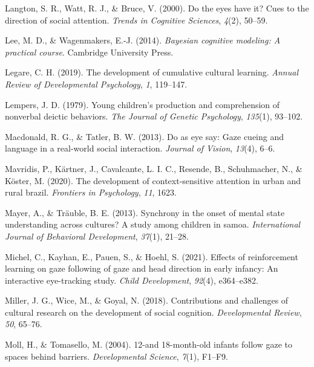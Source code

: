 \documentclass[
  man,floatsintext]{apa7}
\newlength{\cslhangindent}
\newlength{\cslentryspacingunit} %
\newenvironment{CSLReferences}[2] %
 {%
  \setlength{\parindent}{0pt}
  \ifodd #1
  \let\oldpar\par
  \def\par{\hangindent=\cslhangindent\oldpar}
  \fi
  \setlength{\parskip}{#2\cslentryspacingunit}
 }%
 {}
\begin{document}
\begin{CSLReferences}{1}{0}
\leavevmode{}%
Langton, S. R., Watt, R. J., \& Bruce, V. (2000). Do the eyes have it? Cues to the direction of social attention. \emph{Trends in Cognitive Sciences}, \emph{4}(2), 50--59.

\leavevmode{}%
Lee, M. D., \& Wagenmakers, E.-J. (2014). \emph{Bayesian cognitive modeling: A practical course}. Cambridge University Press.

\leavevmode{}%
Legare, C. H. (2019). The development of cumulative cultural learning. \emph{Annual Review of Developmental Psychology}, \emph{1}, 119--147.

\leavevmode{}%
Lempers, J. D. (1979). Young children's production and comprehension of nonverbal deictic behaviors. \emph{The Journal of Genetic Psychology}, \emph{135}(1), 93--102.

\leavevmode{}%
Macdonald, R. G., \& Tatler, B. W. (2013). Do as eye say: Gaze cueing and language in a real-world social interaction. \emph{Journal of Vision}, \emph{13}(4), 6--6.

\leavevmode{}%
Mavridis, P., Kärtner, J., Cavalcante, L. I. C., Resende, B., Schuhmacher, N., \& Köster, M. (2020). The development of context-sensitive attention in urban and rural brazil. \emph{Frontiers in Psychology}, \emph{11}, 1623.

\leavevmode{}%
Mayer, A., \& Träuble, B. E. (2013). Synchrony in the onset of mental state understanding across cultures? A study among children in samoa. \emph{International Journal of Behavioral Development}, \emph{37}(1), 21--28.

\leavevmode{}%
Michel, C., Kayhan, E., Pauen, S., \& Hoehl, S. (2021). Effects of reinforcement learning on gaze following of gaze and head direction in early infancy: An interactive eye-tracking study. \emph{Child Development}, \emph{92}(4), e364--e382.

\leavevmode{}%
Miller, J. G., Wice, M., \& Goyal, N. (2018). Contributions and challenges of cultural research on the development of social cognition. \emph{Developmental Review}, \emph{50}, 65--76.

\leavevmode{}%
Moll, H., \& Tomasello, M. (2004). 12-and 18-month-old infants follow gaze to spaces behind barriers. \emph{Developmental Science}, \emph{7}(1), F1--F9.


\end{CSLReferences}
\end{document}
